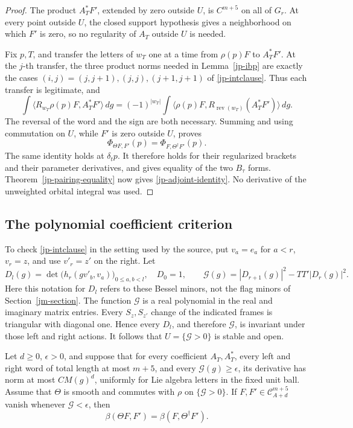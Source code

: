 \begin{proof}
The product \(A_T^*F'\), extended by zero outside \(U\),
is \(C^{m+5}\) on all of \(G_r\).
At every point outside \(U\), the closed support hypothesis
gives a neighborhood on which \(F'\) is zero, so no
regularity of \(A_T\) outside \(U\) is needed.

Fix \(p,T\), and transfer the letters of \(w_T\) one at a
time from \(\rho(p)F\) to \(A_T^*F'\).
At the \(j\)-th transfer, the three product norms needed in
Lemma~\ref{jp-ibp} are exactly the cases
\((i,j)=(j,j+1),(j,j),(j+1,j+1)\) of
\eqref{jp-intclause}.  Thus each transfer is legitimate,
and
\[
 \int\langle R_{w_T}\rho(p)F,A_T^*F'\rangle\,dg
   =(-1)^{|w_T|}
      \int\langle\rho(p)F,
                 R_{\operatorname{rev}(w_T)}(A_T^*F')\rangle\,dg .
\]
The reversal of the word and the sign are both necessary.
Summing and using commutation on \(U\), while \(F'\) is
zero outside \(U\), proves
\[
                  \Phi_{\Theta F,F'}(p)
                               =\Phi_{F,\Theta^\dagger F'}(p).
\]
The same identity holds at \(\delta_t p\).
It therefore holds for their regularized brackets and their
parameter derivatives, and gives equality of the two
\(B_\tau\) forms.  Theorem~\ref{jp-pairing-equality} now
gives \eqref{jp-adjoint-identity}.
No derivative of the unweighted orbital integral was used.
\end{proof}

\subsection{The polynomial coefficient criterion}

To check \eqref{jp-intclause} in the setting used by the
source, put \(v_a=e_a\) for \(a<r\), \(v_r=z\), and use
\(v'_r=z'\) on the right.
Let
\[
 D_l(g)=\det\bigl(h_r(gv'_b,v_a)\bigr)_{0\leq a,b<l},
 \quad D_0=1,\qquad
 \mathcal G(g)=|D_{r+1}(g)|^2-TT'|D_r(g)|^2 .
\]
Here this notation for \(D_l\) refers to these Bessel
minors, not the flag minors of Section~\ref{jm-section}.
The function \(\mathcal G\) is a real polynomial in the
real and imaginary matrix entries.
Every \(S_z,S_{z'}\) change of the indicated frames is
triangular with diagonal one.  Hence every \(D_l\),
and therefore \(\mathcal G\), is invariant under those
left and right actions.
It follows that \(U=\{\mathcal G>0\}\) is stable and open.

\begin{corollary}\label{jp-poly-adjoint}
Let \(d\geq0\), \(\epsilon>0\), and suppose that for every
coefficient \(A_T,A_T^*\), every left and right word of
total length at most \(m+5\), and every
\(\mathcal G(g)\geq\epsilon\), its derivative has norm at
most \(C M(g)^d\), uniformly for Lie algebra letters in
the fixed unit ball.
Assume that \(\Theta\) is smooth and commutes with \(\rho\)
on \(\{\mathcal G>0\}\).
If \(F,F'\in\mathcal C_{A+d}^{m+5}\) vanish whenever
\(\mathcal G<\epsilon\), then
\[
                         \beta(\Theta F,F')
                                      =\beta(F,\Theta^\dagger F').
\]
\end{corollary}

